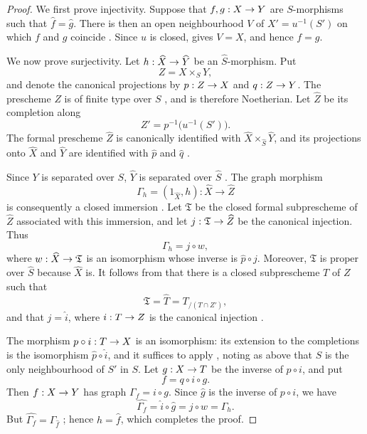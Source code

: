 \documentclass[oneside]{amsart}
\theoremstyle{ega-env-style}
\theoremstyle{ega-thm-env-style}
\theoremstyle{ega-defn-env-style}
\renewcommand{\to}{\mathchoice{\longrightarrow}{\rightarrow}{\rightarrow}{\rightarrow}}
\newcommand{\oldpage}[2][]{{\marginnote{\normalfont{\textbf{#1}~|~#2}}}\ignorespaces}
\begin{document}
\begin{proof}
We first prove injectivity.  Suppose that $f,g:X\to Y$ are
$S$-morphisms such that $\widehat{f}=\widehat{g}$.  There is then
an open neighbourhood $V$ of $X'=u^{-1}(S')$ on which $f$ and $g$
coincide .  Since $u$ is closed,
 gives $V=X$, and hence $f=g$.

We now prove surjectivity.  Let
$h:\widehat{X}\to\widehat{Y}$ be an
$\widehat{S}$-morphism.  Put
\[
  Z=X\times_S Y,
\]
and denote the canonical projections by $p:Z\to X$ and
$q:Z\to Y$.  The prescheme $Z$ is of finite type over $S$
, and is therefore Noetherian.  Let
$\widehat{Z}$ be its completion along
\[
  Z'=p^{-1}\bigl(u^{-1}(S')\bigr).
\]
The formal prescheme $\widehat{Z}$ is canonically identified with
$\widehat{X}\times_{\widehat{S}}\widehat{Y}$, and its projections
onto $\widehat{X}$ and $\widehat{Y}$ are identified with
$\widehat{p}$ and $\widehat{q}$ .

Since $Y$ is separated over $S$, $\widehat{Y}$ is separated over
$\widehat{S}$ .  The graph morphism
\[
  \Gamma_h=(1_{\widehat{X}},h):
  \widehat{X}\longrightarrow\widehat{Z}
\]
is consequently a closed immersion .  Let
$\mathfrak{T}$ be the closed formal subprescheme of
$\widehat{Z}$ associated with this immersion, and let
$j:\mathfrak{T}\to\widehat{Z}$ be the canonical injection.  Thus
\[
  \Gamma_h=j\circ w,
\]
where $w:\widehat{X}\to\mathfrak{T}$ is an isomorphism
 whose inverse is
$\widehat{p}\circ j$.  Moreover, $\mathfrak{T}$ is proper over
$\widehat{S}$ because $\widehat{X}$ is.  It follows from
 that there is a closed subprescheme $T$ of $Z$
such that
\[
  \mathfrak{T}
  =\widehat{T}
  =T_{/(T\cap Z')},
\]
and that $j=\widehat{i}$, where $i:T\to Z$ is the canonical
injection .

The morphism $p\circ i:T\to X$ is an isomorphism: its extension to
the completions is the isomorphism
$\widehat{p}\circ\widehat{i}$, and it suffices to apply
, noting as above that $S$ is the only
neighbourhood of $S'$ in $S$.
\oldpage[III]{157}
Let $g:X\to T$ be the inverse of $p\circ i$, and put
\[
  f=q\circ i\circ g.
\]
Then $f:X\to Y$ has graph $\Gamma_f=i\circ g$.  Since
$\widehat{g}$ is the inverse of
$\widehat{p\circ i}$, we have
\[
  \widehat{\Gamma_f}
  =\widehat{i}\circ\widehat{g}
  =j\circ w
  =\Gamma_h.
\]
But $\widehat{\Gamma_f}=\Gamma_{\widehat{f}}$
; hence $h=\widehat{f}$, which completes the
proof.
\end{proof}
\end{document}
